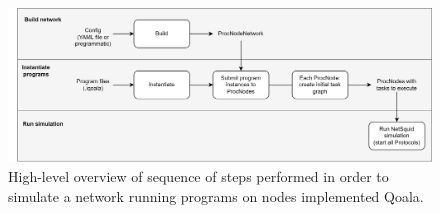 \begin{figure}[hp]
    \centering
    \includegraphics[width=\textwidth]{figures/qoala/simulator_sequence.png}
    \caption{High-level overview of sequence of steps performed in order to simulate a network running programs on nodes implemented Qoala.
    }
    \label{qoala:fig:app:simulator_sequence}
\end{figure}


